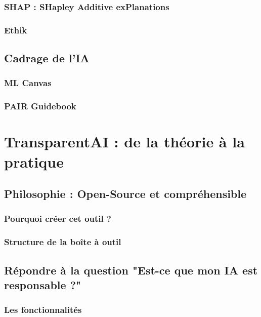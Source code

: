 \documentclass[10pt, french, a4paper]{report}
\begin{document}
\subsubsection{SHAP : SHapley Additive exPlanations}

\subsubsection{Ethik}

\subsection{Cadrage de l'IA}

\subsubsection{ML Canvas}

\subsubsection{PAIR Guidebook}

\section{TransparentAI : de la théorie à la pratique}

\subsection{Philosophie : Open-Source et compréhensible}

\subsubsection{Pourquoi créer cet outil ?}

\subsubsection{Structure de la boîte à outil}

\subsection{Répondre à la question "Est-ce que mon IA est responsable ?"}

\subsubsection{Les fonctionnalités}
\end{document}
